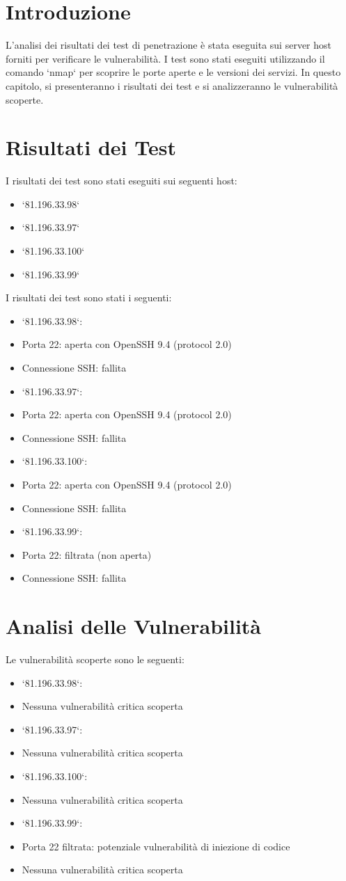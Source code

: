 \section{Introduzione}

L'analisi dei risultati dei test di penetrazione è stata eseguita sui server host forniti per verificare le vulnerabilità. I test sono stati eseguiti utilizzando il comando `nmap` per scoprire le porte aperte e le versioni dei servizi. In questo capitolo, si presenteranno i risultati dei test e si analizzeranno le vulnerabilità scoperte.

\section{Risultati dei Test}

I risultati dei test sono stati eseguiti sui seguenti host:
\begin{itemize}
\item `81.196.33.98`
\item `81.196.33.97`
\item `81.196.33.100`
\item `81.196.33.99`
\end{itemize}
I risultati dei test sono stati i seguenti:
\begin{itemize}
\item `81.196.33.98`:
\item Porta 22: aperta con OpenSSH 9.4 (protocol 2.0)
\item Connessione SSH: fallita
\item `81.196.33.97`:
\item Porta 22: aperta con OpenSSH 9.4 (protocol 2.0)
\item Connessione SSH: fallita
\item `81.196.33.100`:
\item Porta 22: aperta con OpenSSH 9.4 (protocol 2.0)
\item Connessione SSH: fallita
\item `81.196.33.99`:
\item Porta 22: filtrata (non aperta)
\item Connessione SSH: fallita
\end{itemize}
\section{Analisi delle Vulnerabilità}

Le vulnerabilità scoperte sono le seguenti:
\begin{itemize}
\item `81.196.33.98`:
\item Nessuna vulnerabilità critica scoperta
\item `81.196.33.97`:
\item Nessuna vulnerabilità critica scoperta
\item `81.196.33.100`:
\item Nessuna vulnerabilità critica scoperta
\item `81.196.33.99`:
\item Porta 22 filtrata: potenziale vulnerabilità di iniezione di codice
\item Nessuna vulnerabilità critica scoperta
\end{itemize}
